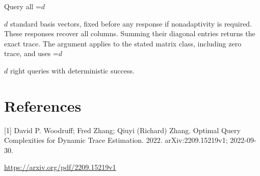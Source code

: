\documentclass[10pt,a4paper]{article}
\newcommand{\AtlasMath}[1]{\par\begingroup\centering\setbox0=\hbox{$\displaystyle #1$}\ifdim\wd0>1.4\linewidth\typeout{ATLAS WIDE FORMULA: \the\wd0}\fi\ifdim\wd0>\linewidth\resizebox{\linewidth}{!}{\box0}\else\box0\fi\par\endgroup}
\newcommand{\AtlasInlineMath}[1]{\begingroup\setbox0=\hbox{$#1$}\ifdim\wd0>.4\linewidth\endgroup\AtlasMath{#1}\else\endgroup$#1$\fi}
\begin{document}
Query all \AtlasInlineMath{d} standard basis vectors, fixed before any response if nonadaptivity is required. These responses recover all columns. Summing their diagonal entries returns the exact trace. The argument applies to the stated matrix class, including zero trace, and uses \AtlasInlineMath{d} right queries with deterministic success.

\section{References}
[1] David P. Woodruff; Fred Zhang; Qiuyi (Richard) Zhang. Optimal Query Complexities for Dynamic Trace Estimation. 2022. arXiv:2209.15219v1; 2022-09-30.

\url{https://arxiv.org/pdf/2209.15219v1}
\end{document}
